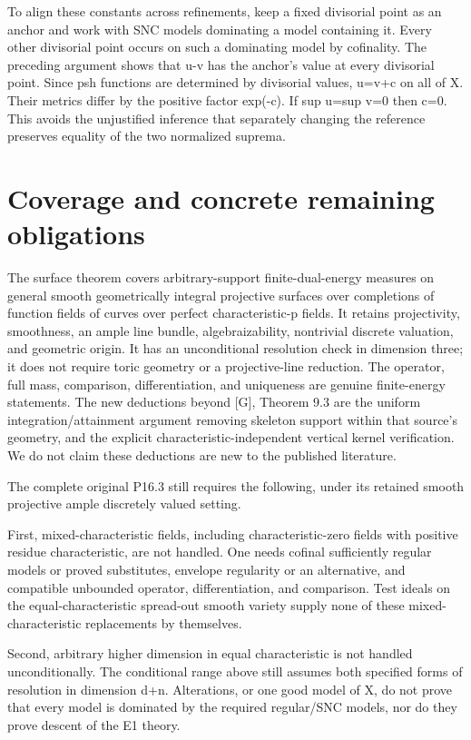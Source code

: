 \documentclass[11pt]{article}
\begin{document}
To align these constants across refinements, keep a fixed divisorial point as an anchor and work with SNC models dominating a model containing it. Every other divisorial point occurs on such a dominating model by cofinality. The preceding argument shows that u-v has the anchor's value at every divisorial point. Since psh functions are determined by divisorial values, u=v+c on all of X. Their metrics differ by the positive factor exp(-c). If sup u=sup v=0 then c=0. This avoids the unjustified inference that separately changing the reference preserves equality of the two normalized suprema.

\section{Coverage and concrete remaining obligations}

The surface theorem covers arbitrary-support finite-dual-energy measures on general smooth geometrically integral projective surfaces over completions of function fields of curves over perfect characteristic-p fields. It retains projectivity, smoothness, an ample line bundle, algebraizability, nontrivial discrete valuation, and geometric origin. It has an unconditional resolution check in dimension three; it does not require toric geometry or a projective-line reduction. The operator, full mass, comparison, differentiation, and uniqueness are genuine finite-energy statements. The new deductions beyond [G], Theorem 9.3 are the uniform integration/attainment argument removing skeleton support within that source's geometry, and the explicit characteristic-independent vertical kernel verification. We do not claim these deductions are new to the published literature.

The complete original P16.3 still requires the following, under its retained smooth projective ample discretely valued setting.

First, mixed-characteristic fields, including characteristic-zero fields with positive residue characteristic, are not handled. One needs cofinal sufficiently regular models or proved substitutes, envelope regularity or an alternative, and compatible unbounded operator, differentiation, and comparison. Test ideals on the equal-characteristic spread-out smooth variety supply none of these mixed-characteristic replacements by themselves.

Second, arbitrary higher dimension in equal characteristic is not handled unconditionally. The conditional range above still assumes both specified forms of resolution in dimension d+n. Alterations, or one good model of X, do not prove that every model is dominated by the required regular/SNC models, nor do they prove descent of the E1 theory.
\end{document}
